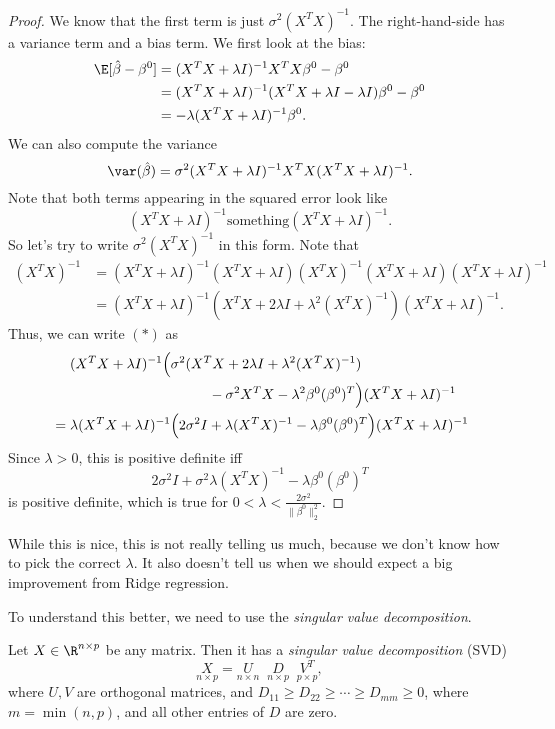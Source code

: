 \documentclass[a4paper]{article}
\begin{document}
\begin{proof}
  We know that the first term is just $\sigma^2(X^T X)^{-1}$. The right-hand-side has a variance term and a bias term. We first look at the bias:
  \begin{align*}
    \E [\hat{\beta} - \beta^0] &= (X^T X + \lambda I)^{-1} X^T X \beta^0 - \beta^0\\
    &= (X^T X + \lambda I)^{-1}(X^T X + \lambda I - \lambda I) \beta^0- \beta^0\\
    &= - \lambda (X^T X + \lambda I)^{-1} \beta^0.
  \end{align*}
  We can also compute the variance
  \[
    \var(\hat{\beta}) = \sigma^2(X^T X + \lambda I)^{-1} X^T X (X^T X + \lambda I)^{-1}.
  \]
  Note that both terms appearing in the squared error look like
  \[
    (X^T X + \lambda I)^{-1}\text{something}(X^T X + \lambda I)^{-1}.
  \]
  So let's try to write $\sigma^2 (X^T X)^{-1}$ in this form. Note that
  \begin{align*}
    (X^T X)^{-1} &= (X^T X + \lambda I)^{-1} (X^T X + \lambda I) (X^T X)^{-1} (X^T X + \lambda I) (X^T X + \lambda I)^{-1}\\
    &= (X^T X + \lambda I)^{-1}(X^T X + 2 \lambda I + \lambda^2 (X^T X)^{-1}) (X^T X + \lambda I)^{-1}.
  \end{align*}
  Thus, we can write $(*)$ as
  \begin{align*}
    &\hphantom{ {} = {} }(X^T X + \lambda I)^{-1} \Big( \sigma^2(X^T X + 2 \lambda I + \lambda^2(X^T X)^{-1})\\
    &\hphantom{adasdfafdasfdfadsfasdf}- \sigma^2 X^T X - \lambda^2 \beta^0 (\beta^0)^T\Big) (X^T X + \lambda I)^{-1}\\
    &= \lambda (X^T X + \lambda I)^{-1} \Big( 2 \sigma^2 I + \lambda(X^T X)^{-1} - \lambda \beta^0 (\beta^0)^T\Big) (X^T X + \lambda I)^{-1}
  \end{align*}
  Since $\lambda > 0$, this is positive definite iff
  \[
    2 \sigma^2 I + \sigma^2 \lambda (X^T X)^{-1} - \lambda \beta^0 (\beta^0)^T
  \]
  is positive definite, which is true for $0 < \lambda < \frac{2\sigma^2}{\|\beta^0\|_2^2}$.
\end{proof}
While this is nice, this is not really telling us much, because we don't know how to pick the correct $\lambda$. It also doesn't tell us when we should expect a big improvement from Ridge regression.

To understand this better, we need to use the \emph{singular value decomposition}.

\begin{thm}
  Let $X \in \R^{n \times p}$ be any matrix. Then it has a \emph{singular value decomposition} (SVD)
  \[
    \underset{n \times p}{X} = \underset{n \times n}{U}\;\;\underset{n \times p}{D}\;\;\underset{p \times p}{V^T},
  \]
  where $U, V$ are orthogonal matrices, and $D_{11} \geq D_{22} \geq \cdots \geq D_{mm} \geq 0$, where $m = \min (n, p)$, and all other entries of $D$ are zero.
\end{thm}
\end{document}
